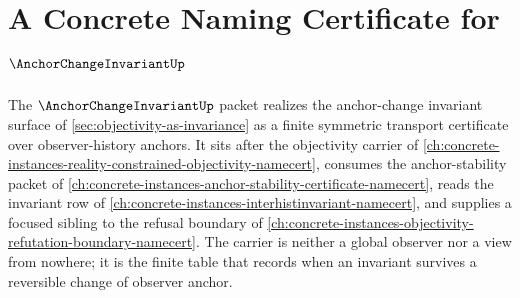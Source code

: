 \chapter{A Concrete Naming Certificate for $\AnchorChangeInvariantUp$}
\label{ch:concrete-instances-anchor-change-invariant-namecert}

The $\AnchorChangeInvariantUp$ packet realizes the anchor-change invariant surface of \autoref{sec:objectivity-as-invariance} as a finite symmetric transport certificate over observer-history anchors. It sits after the objectivity carrier of \autoref{ch:concrete-instances-reality-constrained-objectivity-namecert}, consumes the anchor-stability packet of \autoref{ch:concrete-instances-anchor-stability-certificate-namecert}, reads the invariant row of \autoref{ch:concrete-instances-interhistinvariant-namecert}, and supplies a focused sibling to the refusal boundary of \autoref{ch:concrete-instances-objectivity-refutation-boundary-namecert}. The carrier is neither a global observer nor a view from nowhere; it is the finite table that records when an invariant survives a reversible change of observer anchor.

